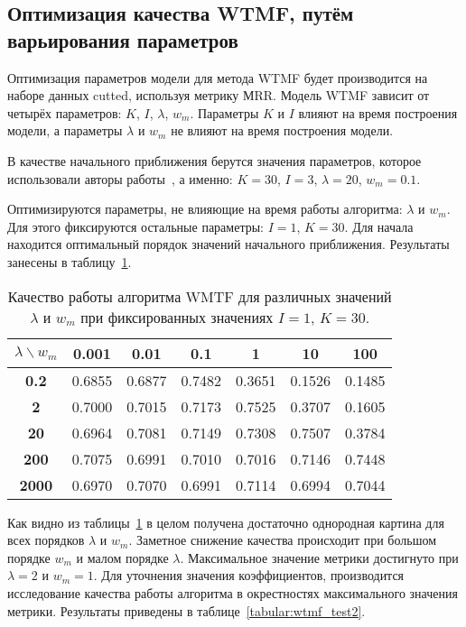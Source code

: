 \subsection{Оптимизация качества WTMF, путём варьирования параметров}
    Оптимизация параметров модели для метода WTMF будет производится на наборе данных cutted, используя метрику МRR.
    Модель WTMF зависит от четырёх параметров: $K$, $I$, $\lambda$, $w_m$.
    Параметры $K$ и $I$ влияют на время построения модели, а параметры $\lambda$ и $w_m$ не влияют на время построения модели.

    В качестве начального приближения берутся значения параметров, которое использовали авторы работы~\cite{linking_base}, а именно:
    $K=30$, $I=3$, $\lambda=20$, $w_m=0.1$.

    Оптимизируются параметры, не влияющие на время работы алгоритма: $\lambda$ и $w_m$.
    Для этого фиксируются остальные параметры: $I=1$, $K=30$.
    Для начала находится оптимальный порядок значений начального приближения. Результаты занесены в таблицу~\ref{tabular:wtmf_test1}.

    \begin{table}[ht!]
        \caption{Качество работы алгоритма WMTF для различных значений $\lambda$ и $w_m$ при фиксированных значениях $I=1$, $K=30$. \bigskip}
        \centering

        \label{tabular:wtmf_test1}
        \begin{tabular}{|c|c|c|c|c|c|c|} \hline
            $\lambda \backslash w_m$ & \bf{0.001} & \bf{0.01} & \bf{0.1} & \bf{1} & \bf{10} & \bf{100} \\ \hline
            \bf{0.2} & 0.6855 & 0.6877 & 0.7482 & 0.3651 & 0.1526 & 0.1485 \\ \hline
            \bf{2} & 0.7000 & 0.7015 & 0.7173 & 0.7525 & 0.3707 & 0.1605 \\ \hline
            \bf{20} & 0.6964 & 0.7081 & 0.7149 & 0.7308 & 0.7507 & 0.3784 \\ \hline
            \bf{200} & 0.7075 & 0.6991 & 0.7010 & 0.7016 & 0.7146 & 0.7448 \\ \hline
            \bf{2000} & 0.6970 & 0.7070 & 0.6991 & 0.7114 & 0.6994 & 0.7044 \\ \hline
        \end{tabular}
    \end{table}
    Как видно из таблицы~\ref{tabular:wtmf_test1} в целом получена достаточно однородная картина для всех порядков $\lambda$ и $w_m$.
    Заметное снижение качества происходит при большом порядке $w_m$ и малом порядке $\lambda$.
    Максимальное значение метрики достигнуто при $\lambda=2$ и $w_m=1$.
    Для уточнения значения коэффициентов, производится исследование качества работы алгоритма в окрестностях максимального значения метрики.
    Результаты приведены в таблице~\ref{tabular:wtmf_test2}.

